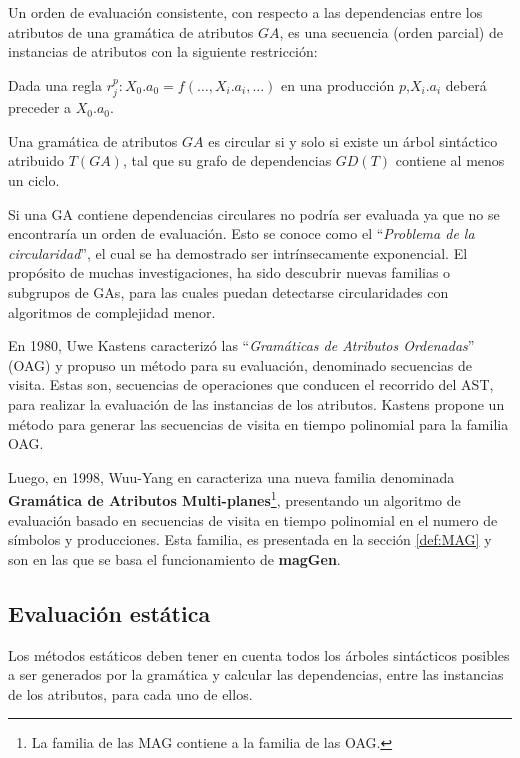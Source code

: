 \documentclass[runningheads,a4paper]{llncs}
\newcommand{\maggen}{\textbf{magGen}}
\begin{document}
\begin{definition} Un orden de evaluación consistente, con respecto a las dependencias entre los atributos de una gramática de atributos $GA$, es una secuencia (orden parcial) de instancias de atributos con la siguiente restricción:

Dada una regla $r_{j}^{p} : X_{0}.a_{0} = f(\ldots, X_{i}.a_{i}, \ldots)$ en una producción $p$,$X_{i}.a_{i}$ deberá preceder a $X_{0}.a_{0}$.
\end{definition}

\begin{definition} 
Una gramática de atributos $GA$ es circular si y solo si existe un árbol sintáctico atribuido $T(GA)$, tal que su grafo de dependencias $GD(T)$ contiene al menos un ciclo.
\end{definition}

Si una GA contiene dependencias circulares no podría ser evaluada ya que no se encontraría un orden de evaluación. Esto se conoce como el ``\textit{Problema de la circularidad}'', el cual se ha demostrado ser intrínsecamente exponencial\cite{intri-exc}. El propósito de muchas investigaciones, ha sido descubrir nuevas familias o subgrupos de GAs, para las cuales puedan detectarse circularidades con algoritmos de complejidad menor.

En 1980, Uwe Kastens\cite{kastens} caracterizó las ``\textit{Gramáticas de Atributos Ordenadas}'' (OAG) y propuso un método para su evaluación, denominado secuencias de visita. Estas son, secuencias de operaciones que conducen el recorrido del AST, para realizar la evaluación de las instancias de los atributos. Kastens propone un método para generar las secuencias de visita en tiempo polinomial para la familia OAG.

Luego, en 1998, Wuu-Yang en \cite{wuu-yang1} caracteriza una nueva familia denominada \textbf{Gramática de Atributos Multi-planes}\footnote{La familia de las MAG contiene a la familia de las OAG.}, presentando un algoritmo de evaluación basado en secuencias de visita en tiempo polinomial en el numero de símbolos y producciones. Esta familia, es presentada en la sección \ref{def:MAG} y son en las que se basa el funcionamiento de \maggen.

\subsection{Evaluación estática}
\label{subsec:eval-est}
Los métodos estáticos deben tener en cuenta todos los árboles sintácticos posibles a ser generados por la gramática y calcular las dependencias, entre las instancias de los atributos, para cada uno de ellos. 
\end{document}

